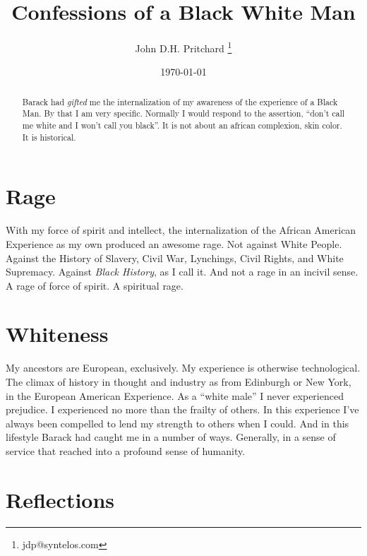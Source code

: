\documentclass[12pt,twocolumn]{article}
\begin{document}
\title{Confessions of a Black White Man}

\author{John D.H. Pritchard \thanks{jdp@syntelos.com}}

\date{\today}

\maketitle


\begin{abstract}

Barack had {\it gifted} me the internalization of my awareness of the
experience of a Black Man.  By that I am very specific.  Normally I
would respond to the assertion, ``don't call me white and I won't call
you black''.  It is not about an african complexion, skin color.  It
is historical.

\end{abstract}


\section{Rage}

With my force of spirit and intellect, the internalization of the
African American Experience as my own produced an awesome rage.  Not
against White People.  Against the History of Slavery, Civil War,
Lynchings, Civil Rights, and White Supremacy.  Against {\it Black
History}, as I call it.  And not a rage in an incivil sense.  A rage
of force of spirit.  A spiritual rage.

\section{Whiteness}

My ancestors are European, exclusively.  My experience is otherwise
technological.  The climax of history in thought and industry as from
Edinburgh or New York, in the European American Experience.  As a
``white male'' I never experienced prejudice.  I experienced no more
than the frailty of others.  In this experience I've always been
compelled to lend my strength to others when I could.  And in this
lifestyle Barack had caught me in a number of ways.  Generally, in a
sense of service that reached into a profound sense of humanity.

\section{Reflections}
\end{document}

